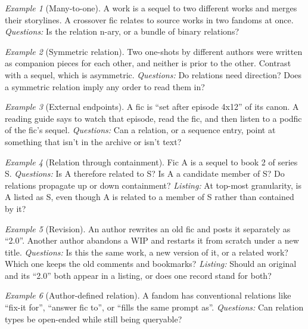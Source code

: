 \documentclass{amsart}
\theoremstyle{remark}
\newtheorem{eg}{Example}
\begin{document}
    \begin{eg}[Many-to-one]\label{eg:many-to-one}
        A work is a sequel to two different works and merges their storylines. A crossover fic relates to source works in two fandoms at once.
        \emph{Questions:} Is the relation n-ary, or a bundle of binary relations?
    \end{eg}
    \begin{eg}[Symmetric relation]\label{eg:companion}
        Two one-shots by different authors were written as companion pieces for each other, and neither is prior to the other. Contrast with a sequel, which is asymmetric.
        \emph{Questions:} Do relations need direction? Does a symmetric relation imply any order to read them in?
    \end{eg}
    \begin{eg}[External endpoints]\label{eg:external}
        A fic is ``set after episode 4x12'' of its canon. A reading guide says to watch that episode, read the fic, and then listen to a podfic of the fic's sequel.
        \emph{Questions:} Can a relation, or a sequence entry, point at something that isn't in the archive or isn't text?
    \end{eg}
    \begin{eg}[Relation through containment]\label{eg:inherited}
        Fic A is a sequel to book 2 of series S.
        \emph{Questions:} Is A therefore related to S? Is A a candidate member of S? Do relations propagate up or down containment?
        \emph{Listing:} At top-most granularity, is A listed as S, even though A is related to a member of S rather than contained by it?
    \end{eg}
    \begin{eg}[Revision]\label{eg:revision}
        An author rewrites an old fic and posts it separately as ``2.0''. Another author abandons a WIP and restarts it from scratch under a new title.
        \emph{Questions:} Is this the same work, a new version of it, or a related work? Which one keeps the old comments and bookmarks?
        \emph{Listing:} Should an original and its ``2.0'' both appear in a listing, or does one record stand for both?
    \end{eg}
    \begin{eg}[Author-defined relation]\label{eg:custom-relation}
        A fandom has conventional relations like ``fix-it for'', ``answer fic to'', or ``fills the same prompt as''.
        \emph{Questions:} Can relation types be open-ended while still being queryable?
    \end{eg}
\end{document}
